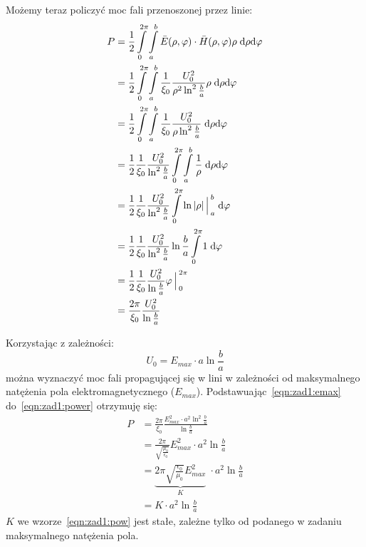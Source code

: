 \documentclass[rep.tex]{subfiles}
\begin{document}
Możemy teraz policzyć moc fali przenoszonej przez linie:
\begin{align}
  P & =  \frac{1}{2} \int\limits_0^{2\pi}\int\limits_a^b \bar{E}(\rho, \varphi) \cdot \bar{H}(\rho, \varphi) \rho \; \mathrm{d\rho} \mathrm{d\varphi} \nonumber \\
    & =  \frac{1}{2} \int\limits_0^{2\pi}\int\limits_a^b \frac{1}{\xi_0}\frac{U_0^2}{\rho^2\ln^2\frac{b}{a}} \rho \; \mathrm{d\rho} \mathrm{d\varphi} \nonumber \\
    & =  \frac{1}{2} \int\limits_0^{2\pi}\int\limits_a^b \frac{1}{\xi_0}\frac{U_0^2}{\rho\ln^2\frac{b}{a}} \; \mathrm{d\rho} \mathrm{d\varphi} \nonumber \\
    & =  \frac{1}{2} \frac{1}{\xi_0}\frac{U_0^2}{\ln^2\frac{b}{a}} \int\limits_0^{2\pi}\int\limits_a^b \frac{1}{\rho} \; \mathrm{d\rho} \mathrm{d\varphi} \nonumber \\
    & =  \frac{1}{2} \frac{1}{\xi_0}\frac{U_0^2}{\ln^2\frac{b}{a}} \int\limits_0^{2\pi} \ln|\rho|\Big\arrowvert_a^b \; \mathrm{d\varphi} \nonumber \\
    & =  \frac{1}{2} \frac{1}{\xi_0}\frac{U_0^2}{\ln^2\frac{b}{a}} \ln\frac{b}{a} \int\limits_0^{2\pi} 1 \; \mathrm{d\varphi} \nonumber \\
    & =  \frac{1}{2} \frac{1}{\xi_0}\frac{U_0^2}{\ln\frac{b}{a}} \varphi\Big\arrowvert_0^{2\pi} \nonumber \\
    & =  \frac{2\pi}{\xi_0}\frac{U_0^2}{\ln\frac{b}{a}} \label{eqn:zad1:power}
\end{align}

Korzystając z zależności:
\begin{equation}
  U_0 = E_{max}\cdot a \ln\frac{b}{a} \label{eqn:zad1:emax}
\end{equation}
można wyznaczyć moc fali propagującej się w lini w zależności od maksymalnego natężenia pola elektromagnetycznego ($E_{max}$).
Podstawuając~\ref{eqn:zad1:emax} do~\ref{eqn:zad1:power} otrzymuję się:
\begin{align}
  P &= \frac{2\pi}{\xi_0}\frac{E_{max}^2 \cdot a^2 \ln^2\frac{b}{a}}{\ln\frac{b}{a}} \nonumber \\
    &= \frac{2\pi}{\sqrt{\frac{\mu_0}{\epsilon_0}}}E_{max}^2 \cdot a^2 \ln\frac{b}{a} \nonumber \\
    &= \underbrace{2\pi\sqrt{\frac{\epsilon_0}{\mu_0}}E_{max}^2}_K \; \cdot a^2 \ln\frac{b}{a} \nonumber \\
    &= K \cdot a^2 \ln\frac{b}{a} \label{eqn:zad1:pow}
\end{align}
$K$ we wzorze~\ref{eqn:zad1:pow} jest stałe, zależne tylko od podanego w zadaniu maksymalnego natężenia pola.
\end{document}
